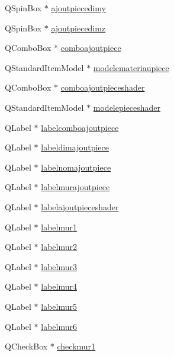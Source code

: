 \begin{DoxyCompactItemize}
\item 
Q\+Spin\+Box $\ast$ \hyperlink{class_main_window_a4d95aef4c72cb18b0599c4e525d1ccdf}{ajoutpiecedimy}
\item 
Q\+Spin\+Box $\ast$ \hyperlink{class_main_window_a2c29b0021713ae3d3f317fb54fdb4962}{ajoutpiecedimz}
\item 
Q\+Combo\+Box $\ast$ \hyperlink{class_main_window_acb844d7f147cf7f5114e0a626c9564df}{comboajoutpiece}
\item 
Q\+Standard\+Item\+Model $\ast$ \hyperlink{class_main_window_a7bdcda1e4a341f69651631c5ee882c41}{modelemateriaupiece}
\item 
Q\+Combo\+Box $\ast$ \hyperlink{class_main_window_ad7c2aad3dda2062d4d26a14709e54ff1}{comboajoutpieceshader}
\item 
Q\+Standard\+Item\+Model $\ast$ \hyperlink{class_main_window_a6be7cafd28d97201c3df69a7b144f456}{modelepieceshader}
\item 
Q\+Label $\ast$ \hyperlink{class_main_window_a5a72195fa8145f88d29886d680f741a0}{labelcomboajoutpiece}
\item 
Q\+Label $\ast$ \hyperlink{class_main_window_ac017a38253ab695f0098c7c853e46f9b}{labeldimajoutpiece}
\item 
Q\+Label $\ast$ \hyperlink{class_main_window_a1d3e7516cbe9514b90e22cf6dc175459}{labelnomajoutpiece}
\item 
Q\+Label $\ast$ \hyperlink{class_main_window_a24709250991f21e3c2672f1e76569d0d}{labelmurajoutpiece}
\item 
Q\+Label $\ast$ \hyperlink{class_main_window_a2c60769cc5ab003462a9d183c26792cc}{labelajoutpieceshader}
\item 
Q\+Label $\ast$ \hyperlink{class_main_window_a2a21ea46a1f1be6c8f474902aaa74bf1}{labelmur1}
\item 
Q\+Label $\ast$ \hyperlink{class_main_window_af5c6fd2af3aa1d234476a0404927c206}{labelmur2}
\item 
Q\+Label $\ast$ \hyperlink{class_main_window_a586d64e68a953b3506846e937df60509}{labelmur3}
\item 
Q\+Label $\ast$ \hyperlink{class_main_window_a1ce750a7b2152528b4bf5153f9b50f55}{labelmur4}
\item 
Q\+Label $\ast$ \hyperlink{class_main_window_aa1074d2c5241b1cf88d93186225f1ed4}{labelmur5}
\item 
Q\+Label $\ast$ \hyperlink{class_main_window_acabc7a22eeffa30597c1278617544a31}{labelmur6}
\item 
Q\+Check\+Box $\ast$ \hyperlink{class_main_window_aabce537f4ce40332b2411e31218abf37}{checkmur1}

\end{DoxyCompactItemize}
